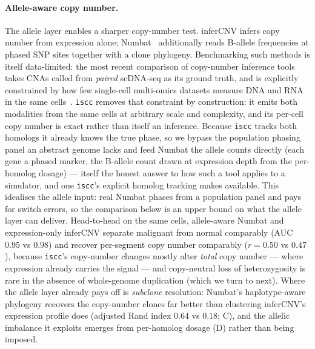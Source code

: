 \documentclass{article}
\begin{document}
\paragraph{Allele-aware copy number.}
The allele layer enables a sharper copy-number test. inferCNV infers copy number from expression alone;
Numbat~\cite{gao_numbat_2023} additionally reads B-allele frequencies at phased SNP sites together with a
clone phylogeny. Benchmarking such methods is itself data-limited: the most recent comparison of
copy-number inference tools takes CNAs called from \emph{paired} scDNA-seq as its ground truth, and is
explicitly constrained by how few single-cell multi-omics datasets measure DNA and RNA in the same
cells~\cite{song_benchmarking_2025}. \texttt{iscc} removes that constraint by construction: it emits both
modalities from the same cells at arbitrary scale and complexity, and its per-cell copy number is exact
rather than itself an inference. Because \texttt{iscc} tracks both homologs it already knows the true
phase, so we bypass the population phasing panel an abstract genome lacks and feed Numbat the allele
counts directly (each gene a phased marker, the B-allele count drawn at expression depth from the
per-homolog dosage) --- itself the honest answer to how such a tool applies to a simulator, and one
\texttt{iscc}'s explicit homolog tracking makes available. This idealises the allele input: real Numbat
phases from a population panel and pays for switch errors, so the comparison below is an upper bound on
what the allele layer can deliver. Head-to-head on the same cells, allele-aware Numbat and expression-only inferCNV
separate malignant from normal comparably (AUC $0.95$ vs $0.98$) and recover per-segment copy number
comparably ($r=0.50$ vs $0.47$), because \texttt{iscc}'s copy-number changes mostly alter \emph{total}
copy number --- where expression already carries the signal --- and copy-neutral loss of heterozygosity
is rare in the absence of whole-genome duplication (which we turn to next). Where the allele layer already
pays off is \emph{subclone} resolution: Numbat's haplotype-aware phylogeny
recovers the copy-number clones far better than clustering inferCNV's expression profile does (adjusted
Rand index $0.64$ vs $0.18$; C), and the allelic imbalance it exploits emerges from
per-homolog dosage (D) rather than being imposed.
\end{document}

